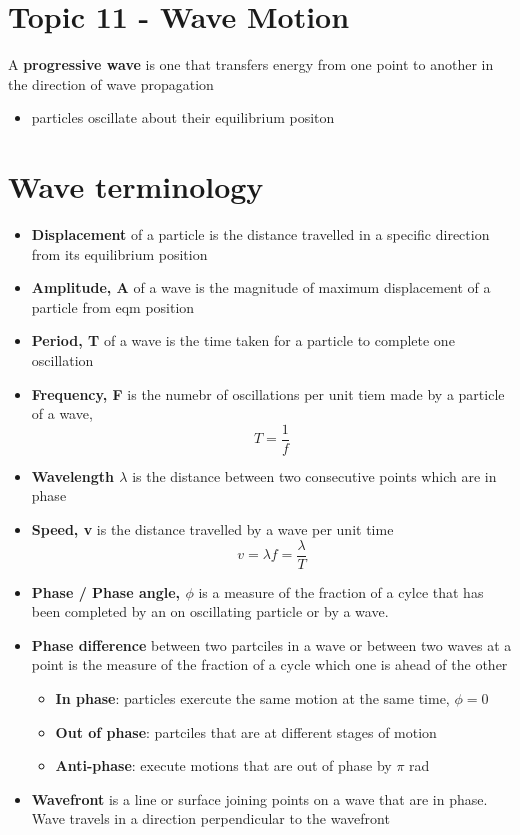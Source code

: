 \documentclass[a4paper, 10pt]{article}
\begin{document}
\section*{Topic 11 - Wave Motion}
\begin{framed}
   A \textbf{progressive wave} is one that transfers energy from one point to another in the direction of wave propagation
\end{framed}	
\begin{itemize}
   \item particles oscillate about their equilibrium positon
\end{itemize}	

\section{Wave terminology}
\begin{itemize}
   \item \textbf{Displacement} of a particle is the distance travelled in a specific direction from its equilibrium position
   \item \textbf{Amplitude, A} of a wave is the magnitude of maximum displacement of a particle from eqm position
   \item \textbf{Period, T} of a wave is the time taken for a particle to complete one oscillation 
   \item \textbf{Frequency, F} is the numebr of oscillations per unit tiem made by a particle of a wave, \[
   T = \frac{1}{f}
   \]
\item \textbf{Wavelength $\lambda$} is the distance between two consecutive points which are in phase
\item \textbf{Speed, v} is the distance travelled by a wave per unit time
   \[
   v = \lambda f = \frac{\lambda}{T}
   \]
   
\item \textbf{Phase / Phase angle, $\phi$ } is a measure of the fraction of a cylce that has been completed by an on oscillating particle or by a wave. 
\item \textbf{Phase difference} between two partciles in a wave or between two waves at a point is the measure of the fraction of a cycle which one is ahead of the other
   \begin{itemize}
      \item \textbf{In phase}: particles exercute the same motion at the same time, $\phi = 0$ 
      \item \textbf{Out of phase}: partciles that are at different stages of motion
      \item \textbf{Anti-phase}: execute motions that are out of phase by $\pi$ rad 
   \end{itemize}	
\item \textbf{Wavefront} is a line or surface joining points on a wave that are in phase. Wave travels in a direction perpendicular to the wavefront
\end{itemize}	
\end{document}
